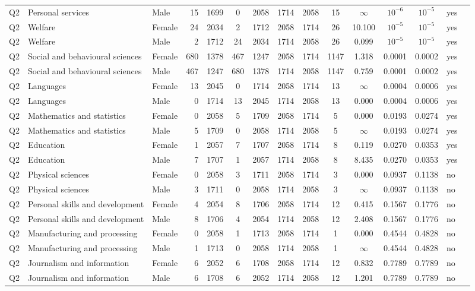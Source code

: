 \begin{longtable}{lllrcccccccccll}
Q2 & Personal services & Male & 15 & 1699 & 0 & 2058 & 1714 & 2058 & 15 & $\infty$ & $10^{-6}$ & $10^{-5}$ & yes \\
Q2 & Welfare & Female & 24 & 2034 & 2 & 1712 & 2058 & 1714 & 26 & 10.100 & $10^{-5}$ & $10^{-5}$ & yes \\
Q2 & Welfare & Male & 2 & 1712 & 24 & 2034 & 1714 & 2058 & 26 & 0.099 & $10^{-5}$ & $10^{-5}$ & yes \\
Q2 & Social and behavioural sciences & Female & 680 & 1378 & 467 & 1247 & 2058 & 1714 & 1147 & 1.318 & 0.0001 & 0.0002 & yes \\
Q2 & Social and behavioural sciences & Male & 467 & 1247 & 680 & 1378 & 1714 & 2058 & 1147 & 0.759 & 0.0001 & 0.0002 & yes \\
Q2 & Languages & Female & 13 & 2045 & 0 & 1714 & 2058 & 1714 & 13 & $\infty$ & 0.0004 & 0.0006 & yes \\
Q2 & Languages & Male & 0 & 1714 & 13 & 2045 & 1714 & 2058 & 13 & 0.000 & 0.0004 & 0.0006 & yes \\
Q2 & Mathematics and statistics & Female & 0 & 2058 & 5 & 1709 & 2058 & 1714 & 5 & 0.000 & 0.0193 & 0.0274 & yes \\
Q2 & Mathematics and statistics & Male & 5 & 1709 & 0 & 2058 & 1714 & 2058 & 5 & $\infty$ & 0.0193 & 0.0274 & yes \\
Q2 & Education & Female & 1 & 2057 & 7 & 1707 & 2058 & 1714 & 8 & 0.119 & 0.0270 & 0.0353 & yes \\
Q2 & Education & Male & 7 & 1707 & 1 & 2057 & 1714 & 2058 & 8 & 8.435 & 0.0270 & 0.0353 & yes \\
Q2 & Physical sciences & Female & 0 & 2058 & 3 & 1711 & 2058 & 1714 & 3 & 0.000 & 0.0937 & 0.1138 & no \\
Q2 & Physical sciences & Male & 3 & 1711 & 0 & 2058 & 1714 & 2058 & 3 & $\infty$ & 0.0937 & 0.1138 & no \\
Q2 & Personal skills and development & Female & 4 & 2054 & 8 & 1706 & 2058 & 1714 & 12 & 0.415 & 0.1567 & 0.1776 & no \\
Q2 & Personal skills and development & Male & 8 & 1706 & 4 & 2054 & 1714 & 2058 & 12 & 2.408 & 0.1567 & 0.1776 & no \\
Q2 & Manufacturing and processing & Female & 0 & 2058 & 1 & 1713 & 2058 & 1714 & 1 & 0.000 & 0.4544 & 0.4828 & no \\
Q2 & Manufacturing and processing & Male & 1 & 1713 & 0 & 2058 & 1714 & 2058 & 1 & $\infty$ & 0.4544 & 0.4828 & no \\
Q2 & Journalism and information & Female & 6 & 2052 & 6 & 1708 & 2058 & 1714 & 12 & 0.832 & 0.7789 & 0.7789 & no \\
Q2 & Journalism and information & Male & 6 & 1708 & 6 & 2052 & 1714 & 2058 & 12 & 1.201 & 0.7789 & 0.7789 & no \\
\end{longtable}
